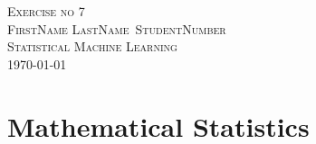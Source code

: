 \documentclass[12pt,a4paper]{article}
\def\StudentName{FirstName LastName}
\def\StudentMatricule{StudentNumber}
\def\ExerciseNo{7}
\numberwithin{exercise}{section} %
\numberwithin{solution}{section} %
\begin{document}
\begin{titlepage}
\begin{center}
\textsc{\LARGE Exercise no \ExerciseNo}\\[1.5cm]
\vspace{2in}
\textsc{\Large \StudentName~\StudentMatricule}\\[0.5cm]
\textsc{Statistical Machine Learning}\\[0.5cm]
\today
\end{center}
\end{titlepage}



\section{Mathematical Statistics}
\end{document}
